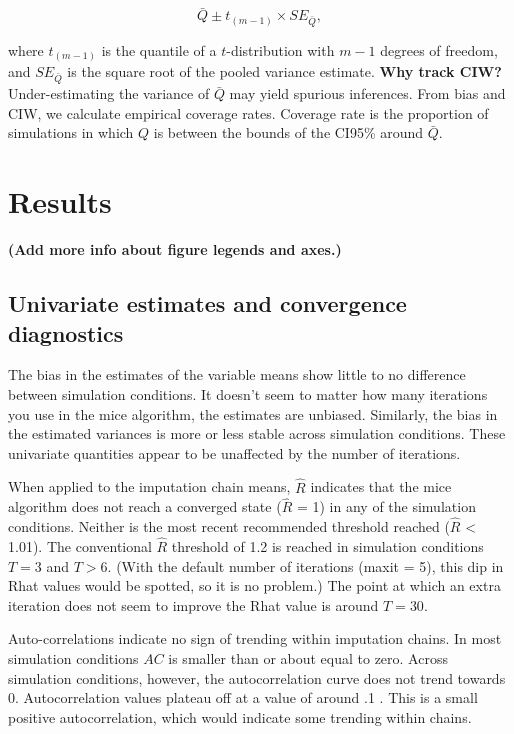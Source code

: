 \documentclass[Royal,times,sageh]{sagej}
\begin{document}
\[\bar{Q} \pm t_{(m-1)} \times SE_{\bar{Q}},\]

where \(t_{(m-1)}\) is the quantile of a \(t\)-distribution with \(m-1\)
degrees of freedom, and \(SE_{\bar{Q}}\) is the square root of the
pooled variance estimate. \textbf{Why track CIW?} Under-estimating the
variance of \(\bar{Q}\) may yield spurious inferences. From bias and
CIW, we calculate empirical coverage rates. Coverage rate is the
proportion of simulations in which \(Q\) is between the bounds of the
CI95\% around \(\bar{Q}\).

\hypertarget{results}{%
\section{Results}\label{results}}

\textbf{(Add more info about figure legends and axes.)}

\hypertarget{univariate-estimates-and-convergence-diagnostics}{%
\subsection{Univariate estimates and convergence
diagnostics}\label{univariate-estimates-and-convergence-diagnostics}}

The bias in the estimates of the variable means show little to no
difference between simulation conditions. It doesn't seem to matter how
many iterations you use in the mice algorithm, the estimates are
unbiased. Similarly, the bias in the estimated variances is more or less
stable across simulation conditions. These univariate quantities appear
to be unaffected by the number of iterations.

When applied to the imputation chain means, \(\widehat{R}\) indicates
that the mice algorithm does not reach a converged state
(\(\widehat{R}\) = 1) in any of the simulation conditions. Neither is
the most recent recommended threshold reached (\(\widehat{R}\)
\textless{} 1.01). The conventional \(\widehat{R}\) threshold of 1.2 is
reached in simulation conditions \(T = 3\) and \(T > 6\). (With the
default number of iterations (maxit = 5), this dip in Rhat values would
be spotted, so it is no problem.) The point at which an extra iteration
does not seem to improve the Rhat value is around \(T=30\).

Auto-correlations indicate no sign of trending within imputation chains.
In most simulation conditions \(AC\) is smaller than or about equal to
zero. Across simulation conditions, however, the autocorrelation curve
does not trend towards 0. Autocorrelation values plateau off at a value
of around .1 . This is a small positive autocorrelation, which would
indicate some trending within chains.
\end{document}
